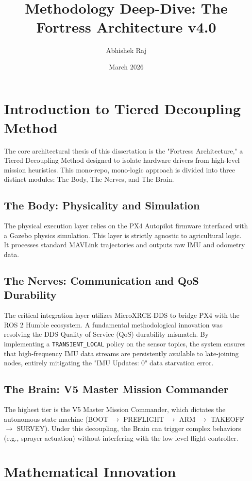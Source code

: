 \documentclass[12pt]{article}
\title{\textbf{Methodology Deep-Dive: The Fortress Architecture v4.0}}
\author{Abhishek Raj}
\date{March 2026}
\begin{document}
\maketitle

\section{Introduction to Tiered Decoupling Method}
The core architectural thesis of this dissertation is the "Fortress Architecture," a Tiered Decoupling Method designed to isolate hardware drivers from high-level mission heuristics. This mono-repo, mono-logic approach is divided into three distinct modules: The Body, The Nerves, and The Brain.

\subsection{The Body: Physicality and Simulation}
The physical execution layer relies on the PX4 Autopilot firmware interfaced with a Gazebo physics simulation. This layer is strictly agnostic to agricultural logic. It processes standard MAVLink trajectories and outputs raw IMU and odometry data.

\subsection{The Nerves: Communication and QoS Durability}
The critical integration layer utilizes MicroXRCE-DDS to bridge PX4 with the ROS 2 Humble ecosystem. A fundamental methodological innovation was resolving the DDS Quality of Service (QoS) durability mismatch. By implementing a \texttt{TRANSIENT\_LOCAL} policy on the sensor topics, the system ensures that high-frequency IMU data streams are persistently available to late-joining nodes, entirely mitigating the "IMU Updates: 0" data starvation error.

\subsection{The Brain: V5 Master Mission Commander}
The highest tier is the V5 Master Mission Commander, which dictates the autonomous state machine (BOOT $\rightarrow$ PREFLIGHT $\rightarrow$ ARM $\rightarrow$ TAKEOFF $\rightarrow$ SURVEY). Under this decoupling, the Brain can trigger complex behaviors (e.g., sprayer actuation) without interfering with the low-level flight controller.

\section{Mathematical Innovation}
\end{document}
